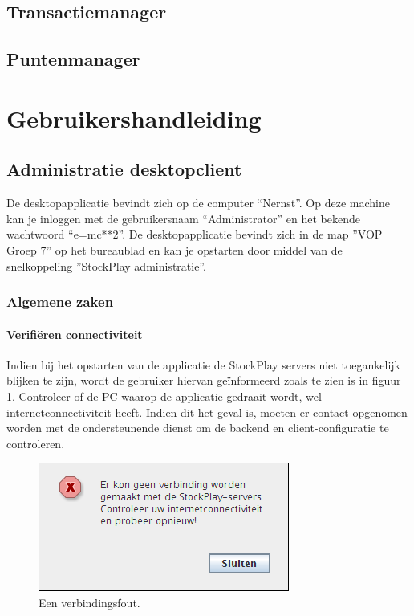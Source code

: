 \subsection{Transactiemanager}

\subsection{Puntenmanager}



%
%

\section{Gebruikershandleiding}

\subsection{Administratie desktopclient}

De desktopapplicatie bevindt zich op de computer ``Nernst''.
Op deze machine kan je inloggen met de gebruikersnaam ``Administrator'' en het bekende wachtwoord ``e=mc**2''.
De desktopapplicatie bevindt zich in de map ''VOP Groep 7'' op het bureaublad en kan je opstarten door middel van de snelkoppeling ''StockPlay administratie''.

\subsubsection{Algemene zaken}
\label{sec:handl:admin:algemeen}

\paragraph{Verifi\"eren connectiviteit}

Indien bij het opstarten van de applicatie de StockPlay servers niet toegankelijk blijken te zijn, wordt de gebruiker hiervan ge\"informeerd zoals te zien is in figuur \ref{fig:handl:admin:verbindingsfout}. Controleer of de PC waarop de applicatie gedraait wordt, wel internetconnectiviteit heeft. Indien dit het geval is, moeten er contact opgenomen worden met de ondersteunende dienst om de backend en client-configuratie te controleren.

\begin{figure}[h!]
	\centering
		\includegraphics[scale=0.75]{images/handleiding/administratie/verbindingsfout}
	\caption{Een verbindingsfout.}
	\label{fig:handl:admin:verbindingsfout}
\end{figure}

